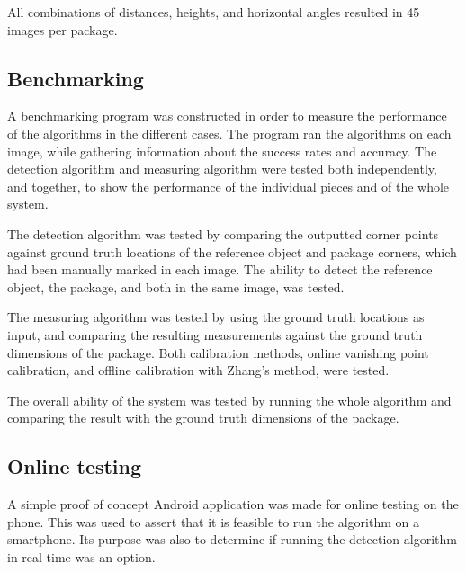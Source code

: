 All combinations of distances, heights, and horizontal angles resulted in 45 images per package.

\subsection{Benchmarking} \label{benchmarking}
A benchmarking program was constructed in order to measure the performance of the algorithms in the different cases.
The program ran the algorithms on each image, while gathering information about the success rates and accuracy.
The detection algorithm and measuring algorithm were tested both independently, and together, to show the performance of the individual pieces and of the whole system. 

The detection algorithm was tested by comparing the outputted corner points against ground truth locations of the reference object and package corners, which had been manually marked in each image.
The ability to detect the reference object, the package, and both in the same image, was tested.

The measuring algorithm was tested by using the ground truth locations as input, and comparing the resulting measurements against the ground truth dimensions of the package.
Both calibration methods, online vanishing point calibration, and offline calibration with Zhang's method, were tested.

The overall ability of the system was tested by running the whole algorithm and comparing the result with the ground truth dimensions of the package. 




\subsection{Online testing} \label{method:online_testing}
A simple proof of concept Android application was made for online testing on the phone.
This was used to assert that it is feasible to run the algorithm on a smartphone.
Its purpose was also to determine if running the detection algorithm in real-time was an option.

